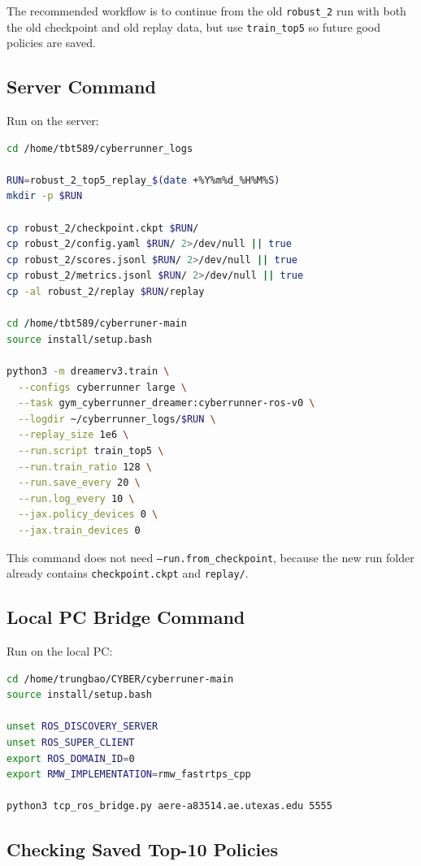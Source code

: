 \documentclass[11pt]{article}
\begin{document}
The recommended workflow is to continue from the old \texttt{robust\_2} run with both the old checkpoint and old replay data, but use \texttt{train\_top5} so future good policies are saved.

\subsection{Server Command}

Run on the server:

\begin{lstlisting}[language=bash]
cd /home/tbt589/cyberrunner_logs

RUN=robust_2_top5_replay_$(date +%Y%m%d_%H%M%S)
mkdir -p $RUN

cp robust_2/checkpoint.ckpt $RUN/
cp robust_2/config.yaml $RUN/ 2>/dev/null || true
cp robust_2/scores.jsonl $RUN/ 2>/dev/null || true
cp robust_2/metrics.jsonl $RUN/ 2>/dev/null || true
cp -al robust_2/replay $RUN/replay

cd /home/tbt589/cyberruner-main
source install/setup.bash

python3 -m dreamerv3.train \
  --configs cyberrunner large \
  --task gym_cyberrunner_dreamer:cyberrunner-ros-v0 \
  --logdir ~/cyberrunner_logs/$RUN \
  --replay_size 1e6 \
  --run.script train_top5 \
  --run.train_ratio 128 \
  --run.save_every 20 \
  --run.log_every 10 \
  --jax.policy_devices 0 \
  --jax.train_devices 0
\end{lstlisting}

This command does not need \texttt{--run.from\_checkpoint}, because the new run folder already contains \texttt{checkpoint.ckpt} and \texttt{replay/}.

\subsection{Local PC Bridge Command}

Run on the local PC:

\begin{lstlisting}[language=bash]
cd /home/trungbao/CYBER/cyberruner-main
source install/setup.bash

unset ROS_DISCOVERY_SERVER
unset ROS_SUPER_CLIENT
export ROS_DOMAIN_ID=0
export RMW_IMPLEMENTATION=rmw_fastrtps_cpp

python3 tcp_ros_bridge.py aere-a83514.ae.utexas.edu 5555
\end{lstlisting}

\subsection{Checking Saved Top-10 Policies}
\end{document}
